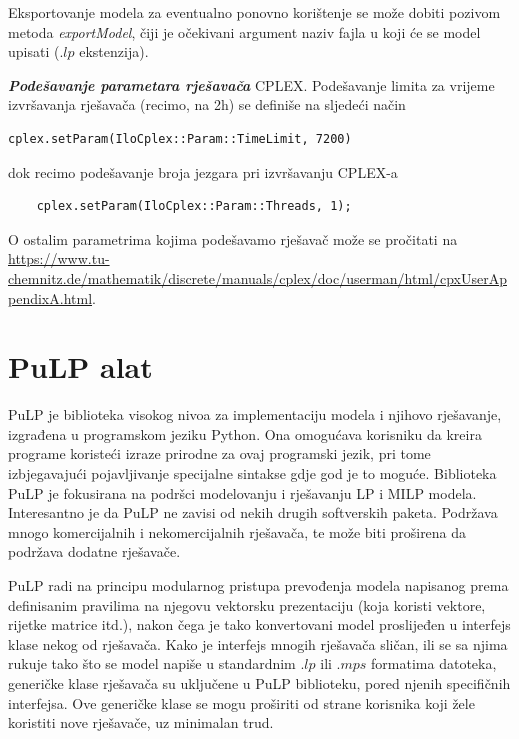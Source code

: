 \documentclass[a4paper, utf8, 11pt, colorlinks]{book}
\begin{document}
Eksportovanje modela za eventualno ponovno korištenje se može dobiti pozivom metoda \emph{exportModel}, čiji je očekivani argument naziv fajla u koji će se model upisati (.$lp$ ekstenzija).  

\emph{\textbf{Podešavanje parametara rješavača}} \textrm{CPLEX}. Podešavanje limita za vrijeme izvršavanja rješavača (recimo, na 2h) se definiše na sljedeći način
\begin{verbatim}
cplex.setParam(IloCplex::Param::TimeLimit, 7200)
\end{verbatim}
dok recimo podešavanje broja jezgara pri izvršavanju CPLEX-a 
\begin{verbatim}
	cplex.setParam(IloCplex::Param::Threads, 1);
\end{verbatim}
O ostalim parametrima kojima podešavamo rješavač može se pročitati na 
\url{https://www.tu-chemnitz.de/mathematik/discrete/manuals/cplex/doc/userman/html/cpxUserAppendixA.html}. 
 \section{PuLP alat}
 PuLP je biblioteka visokog nivoa za implementaciju modela i njihovo rješavanje, izgrađena u programskom jeziku Python.  
 Ona omogućava korisniku da kreira programe koristeći izraze prirodne za ovaj programski jezik,  
 pri tome izbjegavajući pojavljivanje specijalne sintakse gdje god je to moguće. Biblioteka PuLP je fokusirana na podršci modelovanju i rješavanju LP i MILP modela. Interesantno je da PuLP 
 ne zavisi od nekih drugih softverskih paketa.   Podržava mnogo komercijalnih i nekomercijalnih rješavača, te može biti proširena da podržava dodatne rješavače. 
 
 PuLP radi na principu modularnog pristupa prevođenja modela napisanog prema definisanim pravilima na njegovu vektorsku prezentaciju (koja koristi vektore, rijetke matrice itd.), nakon čega je tako konvertovani model proslijeđen u interfejs klase nekog od rješavača. Kako je interfejs mnogih rješavača sličan, ili se sa njima rukuje tako što se model napiše u standardnim .$lp$ ili .$mps$  formatima  datoteka, generičke klase rješavača su uključene  u PuLP biblioteku, pored njenih specifičnih interfejsa.  %
 Ove generičke klase se mogu proširiti od strane korisnika koji žele koristiti nove rješavače, uz minimalan trud.   
 
\end{document}
